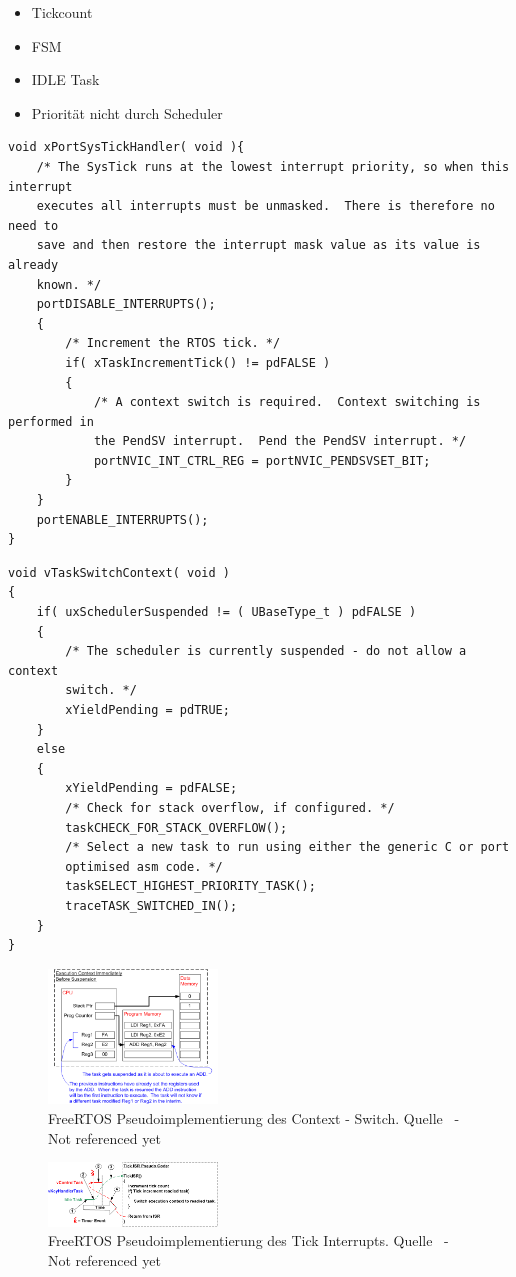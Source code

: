 \begin{itemize}
	\item Tickcount
	\item FSM
	\item IDLE Task
	\item Priorität nicht durch Scheduler
\end{itemize}

\begin{lstlisting}[caption={Implementierung von SysTick aus Task.c}, linewidth=8cm,captionpos=b, label=lst:SysTickS, float=hbt]
void xPortSysTickHandler( void ){
	/* The SysTick runs at the lowest interrupt priority, so when this interrupt
	executes all interrupts must be unmasked.  There is therefore no need to
	save and then restore the interrupt mask value as its value is already
	known. */
	portDISABLE_INTERRUPTS();
	{
		/* Increment the RTOS tick. */
		if( xTaskIncrementTick() != pdFALSE )
		{
			/* A context switch is required.  Context switching is performed in
			the PendSV interrupt.  Pend the PendSV interrupt. */
			portNVIC_INT_CTRL_REG = portNVIC_PENDSVSET_BIT;
		}
	}
	portENABLE_INTERRUPTS();
}
\end{lstlisting}


\begin{lstlisting}[caption={Implementierung von Kontextwechsel aus Task.c}, linewidth=8cm,captionpos=b, label=lst:taskSwitch, float=hbt]
void vTaskSwitchContext( void )
{
	if( uxSchedulerSuspended != ( UBaseType_t ) pdFALSE )
	{
		/* The scheduler is currently suspended - do not allow a context
		switch. */
		xYieldPending = pdTRUE;
	}
	else
	{
		xYieldPending = pdFALSE;
		/* Check for stack overflow, if configured. */
		taskCHECK_FOR_STACK_OVERFLOW();
		/* Select a new task to run using either the generic C or port
		optimised asm code. */
		taskSELECT_HIGHEST_PRIORITY_TASK();
		traceTASK_SWITCHED_IN();
	}
}
\end{lstlisting}



\begin{figure}[ht!]
	\centering
		\includegraphics[width=0.4\textwidth]{Pictures/FreeRTOSOrg/ExeContext.png}
	\caption{FreeRTOS Pseudoimplementierung des Context - Switch. Quelle~\protect{} - Not referenced yet}
	\label{fig:FreeRTOSFsm}
	
\end{figure}

\begin{figure}[ht!]
	\centering
		\includegraphics[width=0.4\textwidth]{Pictures/FreeRTOSOrg/TickISR.png}
	\caption{FreeRTOS Pseudoimplementierung des Tick Interrupts. Quelle~\protect{} - Not referenced yet}
	\label{fig:FreeRTOSFsm}
\end{figure}